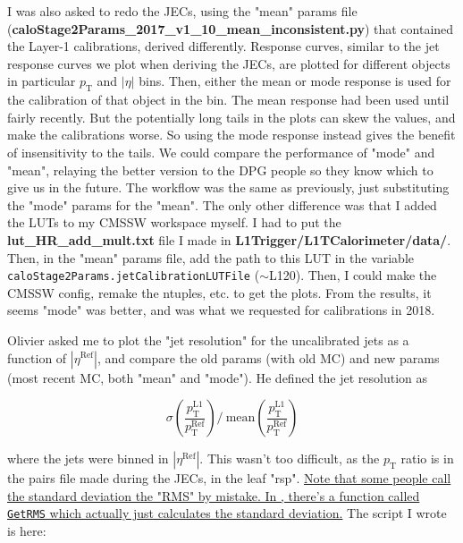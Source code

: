 I was also asked to redo the JECs, using the "mean" params file (\textbf{caloStage2Params\_2017\_v1\_10\_mean\_inconsistent.py}) that contained the Layer-1 calibrations, derived differently. Response curves, similar to the jet response curves we plot when deriving the JECs, are plotted for different objects in particular $p_{\mathrm{T}}$ and $|\eta|$ bins. Then, either the mean or mode response is used for the calibration of that object in the bin. The mean response had been used until fairly recently. But the potentially long tails in the plots can skew the values, and make the calibrations worse. So using the mode response instead gives the benefit of insensitivity to the tails. We could compare the performance of "mode" and "mean", relaying the better version to the DPG people so they know which to give us in the future. The workflow was the same as previously, just substituting the "mode" params for the "mean". The only other difference was that I added the LUTs to my CMSSW workspace myself. I had to put the \textbf{lut\_HR\_add\_mult.txt} file I made in \textbf{L1Trigger/L1TCalorimeter/data/}. Then, in the "mean" params file, add the path to this LUT in the variable \texttt{caloStage2Params.jetCalibrationLUTFile} ($\sim$L120). Then, I could make the CMSSW config, remake the ntuples, etc. to get the plots. From the results, it seems "mode" was better, and was what we requested for calibrations in 2018.

Olivier asked me to plot the "jet resolution" for the uncalibrated jets as a function of $|\eta^{\mathrm{Ref}}|$, and compare the old params (with old MC) and new params (most recent MC, both "mean" and "mode"). He defined the jet resolution as

\begin{equation}
\sigma\left( \frac{ p_{\mathrm{T}}^{\mathrm{L1}} }{ p_{\mathrm{T}}^{\mathrm{Ref}} } \right) /  \ \textrm{mean} \left( \frac{ p_{\mathrm{T}}^{\mathrm{L1}} }{ p_{\mathrm{T}}^{\mathrm{Ref}} } \right)
\end{equation}

where the jets were binned in $|\eta^{\mathrm{Ref}}|$. This wasn't too difficult, as the $p_{\mathrm{T}}$ ratio is in the pairs file made during the JECs, in the leaf "rsp". \uline{Note that some people call the standard deviation the "RMS" by mistake. In \ROOT, there's a function called \texttt{GetRMS} which actually just calculates the standard deviation.} The script I wrote is here:



